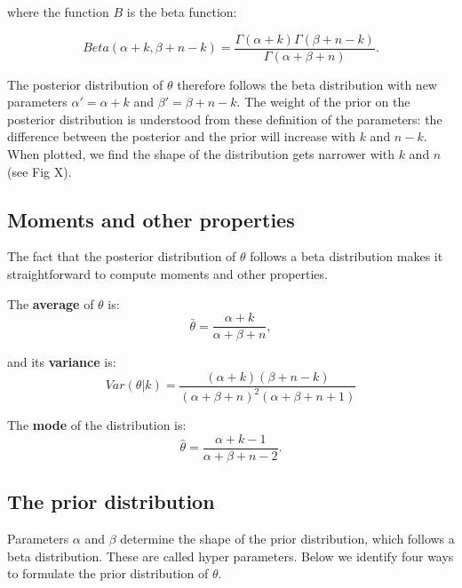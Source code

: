 \documentclass[12pt]{article}
\begin{document}
  \noindent where the function $B$ is the beta function:

  \begin{equation}
    Beta(\alpha+k,\beta+n-k) = \frac{\Gamma(\alpha+k)\Gamma(\beta+n-k)}{\Gamma(\alpha+\beta+n)} . \label{betafunction}
  \end{equation}

  The posterior distribution of $\theta$ therefore follows the beta distribution with new parameters $\alpha'= \alpha+k$ and $\beta'=\beta+n-k$. The weight of the prior on the posterior distribution is understood from these definition of the parameters: the difference between the posterior and the prior will increase with $k$ and $n-k$. When plotted, we find the shape of the distribution gets narrower with $k$ and $n$ (see Fig X). 
%
%
%

  \subsection*{Moments and other properties}

  The fact that the posterior distribution of $\theta$ follows a beta distribution makes it straightforward to compute moments and other properties. 

  The \textbf{average} of $\theta$ is: 
      \begin{equation}
        \bar{\theta} = \frac{\alpha+k}{\alpha+\beta+n} ,
        \label{mean}
      \end{equation}

    and its \textbf{variance} is:  
      \begin{equation}
        Var(\theta|k) = \frac{(\alpha + k)(\beta + n - k)}{(\alpha + \beta + n)^{2}(\alpha + \beta + n +1)}
        \label{variance}
      \end{equation}

    The \textbf{mode} of the distribution is:
      \begin{equation}
        \hat{\theta} = \frac{\alpha + k - 1}{\alpha + \beta + n - 2} .
        \label{mode}
      \end{equation}

  \subsection*{The prior distribution}    
  Parameters $\alpha$ and $\beta$ determine the shape of the prior distribution, which follows a beta distribution. These are called hyper parameters. Below we identify four ways to formulate the prior distribution of $\theta$. 
\end{document}

